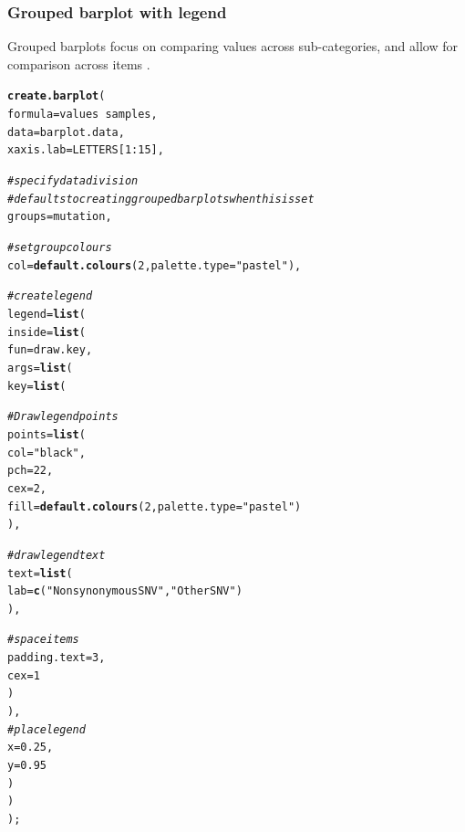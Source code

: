 \documentclass[letterpaper]{report}\usepackage[]{graphicx}\usepackage[]{color}
\makeatletter
\newcommand{\hlnum}[1]{\textcolor[rgb]{0.686,0.059,0.569}{#1}}%
\newcommand{\hlstr}[1]{\textcolor[rgb]{0.192,0.494,0.8}{#1}}%
\newcommand{\hlcom}[1]{\textcolor[rgb]{0.678,0.584,0.686}{\textit{#1}}}%
\newcommand{\hlopt}[1]{\textcolor[rgb]{0,0,0}{#1}}%
\newcommand{\hlstd}[1]{\textcolor[rgb]{0.345,0.345,0.345}{#1}}%
\newcommand{\hlkwc}[1]{\textcolor[rgb]{0.333,0.667,0.333}{#1}}%
\newcommand{\hlkwd}[1]{\textcolor[rgb]{0.737,0.353,0.396}{\textbf{#1}}}%
\newenvironment{kframe}{%
 \def\at@end@of@kframe{}%
 \ifinner\ifhmode%
  \def\at@end@of@kframe{\end{minipage}}%
  \begin{minipage}{\columnwidth}%
 \fi\fi%
 \def\FrameCommand##1{\hskip\@totalleftmargin \hskip-\fboxsep
 \colorbox{shadecolor}{##1}\hskip-\fboxsep
     \hskip-\linewidth \hskip-\@totalleftmargin \hskip\columnwidth}%
 \MakeFramed {\advance\hsize-\width
   \@totalleftmargin\z@ \linewidth\hsize
   \@setminipage}}%
 {\par\unskip\endMakeFramed%
 \at@end@of@kframe}
\newenvironment{knitrout}{}{} %
\makeatother
\begin{document}
\subsubsection{Grouped barplot with legend}
Grouped barplots focus on comparing values across sub-categories, and allow  for comparison across items \cite{streit}.

\begin{knitrout}
\color{fgcolor}\begin{kframe}
\begin{alltt}
\hlkwd{create.barplot}\hlstd{(}
    \hlkwc{formula} \hlstd{= values} \hlopt{~} \hlstd{samples,}
    \hlkwc{data} \hlstd{= barplot.data,}
    \hlkwc{xaxis.lab} \hlstd{= LETTERS[}\hlnum{1}\hlopt{:}\hlnum{15}\hlstd{],}

    \hlcom{# specify data division}
    \hlcom{# defaults to creating grouped bar plots when this is set}
    \hlkwc{groups} \hlstd{= mutation,}

    \hlcom{# set group colours}
    \hlkwc{col} \hlstd{=} \hlkwd{default.colours}\hlstd{(}\hlnum{2}\hlstd{,} \hlkwc{palette.type} \hlstd{=} \hlstr{"pastel"}\hlstd{),}

    \hlcom{# create legend }
    \hlkwc{legend} \hlstd{=} \hlkwd{list}\hlstd{(}
        \hlkwc{inside} \hlstd{=} \hlkwd{list}\hlstd{(}
            \hlkwc{fun} \hlstd{= draw.key,}
            \hlkwc{args} \hlstd{=} \hlkwd{list}\hlstd{(}
                \hlkwc{key} \hlstd{=} \hlkwd{list}\hlstd{(}

                    \hlcom{# Draw legend points}
                    \hlkwc{points} \hlstd{=} \hlkwd{list}\hlstd{(}
                        \hlkwc{col} \hlstd{=} \hlstr{"black"}\hlstd{,}
                        \hlkwc{pch} \hlstd{=} \hlnum{22}\hlstd{,}
                        \hlkwc{cex} \hlstd{=} \hlnum{2}\hlstd{,}
                        \hlkwc{fill} \hlstd{=} \hlkwd{default.colours}\hlstd{(}\hlnum{2}\hlstd{,} \hlkwc{palette.type} \hlstd{=} \hlstr{"pastel"}\hlstd{)}
                        \hlstd{),}

                    \hlcom{# draw legend text}
                    \hlkwc{text} \hlstd{=} \hlkwd{list}\hlstd{(}
                        \hlkwc{lab} \hlstd{=} \hlkwd{c}\hlstd{(}\hlstr{"Nonsynonymous SNV"}\hlstd{,} \hlstr{"Other SNV"}\hlstd{)}
                        \hlstd{),}

                    \hlcom{# space items}
                    \hlkwc{padding.text} \hlstd{=} \hlnum{3}\hlstd{,}
                    \hlkwc{cex} \hlstd{=} \hlnum{1}
                    \hlstd{)}
                \hlstd{),}
            \hlcom{# place legend}
            \hlkwc{x} \hlstd{=} \hlnum{0.25}\hlstd{,}
            \hlkwc{y} \hlstd{=} \hlnum{0.95}
            \hlstd{)}
        \hlstd{)}
    \hlstd{);}
\end{alltt}
\end{kframe}\begin{figure}


\end{figure}
\end{knitrout}
\end{document}
